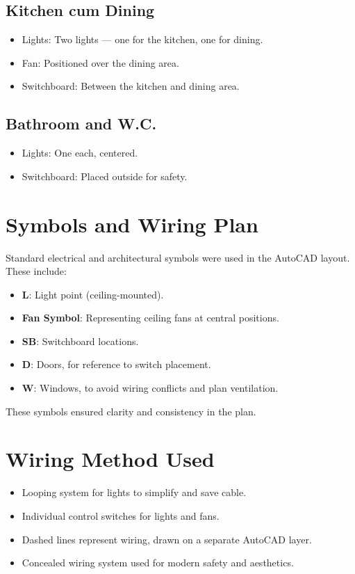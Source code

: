 \documentclass[12pt]{article}
\begin{document}
\subsection*{Kitchen cum Dining}
\begin{itemize}
    \item Lights: Two lights — one for the kitchen, one for dining.
    \item Fan: Positioned over the dining area.
    \item Switchboard: Between the kitchen and dining area.
\end{itemize}

\subsection*{Bathroom and W.C.}
\begin{itemize}
    \item Lights: One each, centered.
    \item Switchboard: Placed outside for safety.
\end{itemize}

\section*{Symbols and Wiring Plan}
Standard electrical and architectural symbols were used in the AutoCAD layout. These include:

\begin{itemize}
    \item \textbf{L}: Light point (ceiling-mounted).
    \item \textbf{Fan Symbol}: Representing ceiling fans at central positions.
    \item \textbf{SB}: Switchboard locations.
    \item \textbf{D}: Doors, for reference to switch placement.
    \item \textbf{W}: Windows, to avoid wiring conflicts and plan ventilation.
\end{itemize}

These symbols ensured clarity and consistency in the plan.

\section*{Wiring Method Used}
\begin{itemize}
    \item Looping system for lights to simplify and save cable.
    \item Individual control switches for lights and fans.
    \item Dashed lines represent wiring, drawn on a separate AutoCAD layer.
    \item Concealed wiring system used for modern safety and aesthetics.
\end{itemize}
\end{document}
